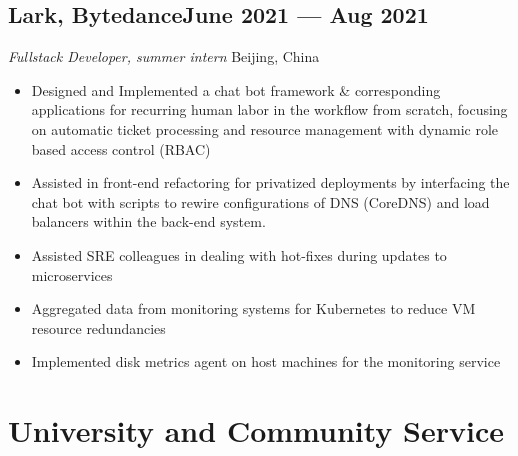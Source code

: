 \documentclass[a4,12pt]{article}
\newcommand{\subtext}[1]{
#1\par\vspace{-0.3cm}}
\newenvironment{zitemize}{
\begin{itemize}\itemsep0pt \parskip0pt \parsep1pt}
{\end{itemize}\vspace{-0.5cm}}
\begin{document}
\subsection*{Lark, Bytedance\hfill June 2021 --- Aug 2021} 
\subtext{\textit{Fullstack Developer, summer intern } \hfill Beijing, China} 
    \begin{zitemize}
        \item Designed and Implemented a chat bot framework \& corresponding applications for recurring human labor in the workflow from scratch, focusing on automatic ticket processing and resource management with dynamic role based access control (RBAC)
        \item Assisted in front-end refactoring for privatized deployments by interfacing the chat bot with scripts to rewire configurations of DNS (CoreDNS) and load balancers within the back-end system.
        \item Assisted SRE colleagues in dealing with hot-fixes during updates to microservices
        \item Aggregated data from monitoring systems for Kubernetes to reduce VM resource redundancies
        \item Implemented disk metrics agent on host machines for the monitoring service
    \end{zitemize}





\section{\textbf{University and Community Service}} %

\end{document}
